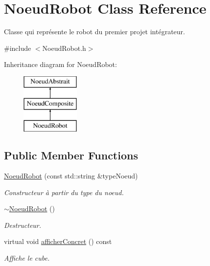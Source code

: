 \hypertarget{class_noeud_robot}{}\section{Noeud\+Robot Class Reference}
\label{class_noeud_robot}


Classe qui représente le robot du premier projet intégrateur.  




{\ttfamily \#include $<$Noeud\+Robot.\+h$>$}

Inheritance diagram for Noeud\+Robot\+:\begin{figure}[H]
\begin{center}
\leavevmode
\includegraphics[height=3.000000cm]{class_noeud_robot}
\end{center}
\end{figure}
\subsection*{Public Member Functions}
\begin{DoxyCompactItemize}
\item 
\hyperlink{group__inf2990_ga147453ac7f72970d7d9bfe336998ad94}{Noeud\+Robot} (const std\+::string \&type\+Noeud)
\begin{DoxyCompactList}\small\item\em Constructeur à partir du type du noeud. \end{DoxyCompactList}\item 
\hyperlink{group__inf2990_ga5649710d151f0548d8a7a279aad4c655}{$\sim$\+Noeud\+Robot} ()
\begin{DoxyCompactList}\small\item\em Destructeur. \end{DoxyCompactList}\item 
virtual void \hyperlink{group__inf2990_gad63a8e09cc5ca8cc349f35e0901474e2}{afficher\+Concret} () const 
\begin{DoxyCompactList}\small\item\em Affiche le cube. \end{DoxyCompactList}\end{DoxyCompactItemize}
